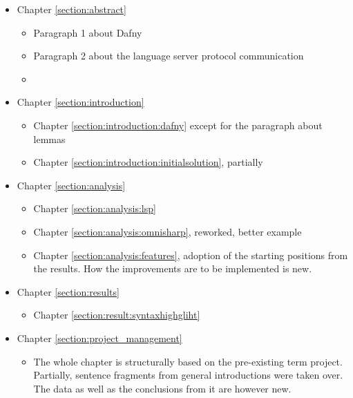 \begin{itemize}
    \item Chapter \ref{section:abstract} 
        \begin{itemize}
            \item Paragraph 1 about Dafny
            \item Paragraph 2 about the language server protocol communication
            \item  {}
        \end{itemize}
    \item Chapter \ref{section:introduction} 
        \begin{itemize}
            \item Chapter \ref{section:introduction:dafny} except for the paragraph about lemmas
            \item Chapter \ref{section:introduction:initialsolution}, partially
        \end{itemize}

    \item Chapter \ref{section:analysis} 
        \begin{itemize}
            \item Chapter \ref{section:analysis:lsp}
            \item Chapter \ref{section:analysis:omnisharp}, reworked, better example
            \item Chapter \ref{section:analysis:features}, adoption of the starting positions from the results. How the improvements are to be implemented is new.
        \end{itemize}

    \item Chapter \ref{section:results} 
        \begin{itemize}
            \item Chapter \ref{section:result:syntaxhighgliht}
        \end{itemize}

    \item Chapter \ref{section:project_management} 
        \begin{itemize}
            \item The whole chapter is structurally based on the pre-existing term project.
            Partially, sentence fragments from general introductions were taken over.
            The data as well as the conclusions from it are however new.
        \end{itemize}


\end{itemize}
